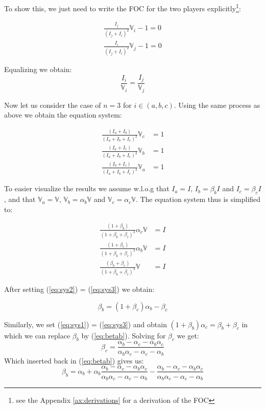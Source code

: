 To show this, we just need to write the FOC for the two players explicitly\footnote{see the Appendix \ref{ax:derivations} for a derivation of the FOC}:

\begin{equation*}
\begin{split}
    \frac{I_j}{(I_j + I_i)^2}\mathbb{V}_i-1 = 0 \\
    \frac{I_i}{(I_j + I_i)^2}\mathbb{V}_j-1 = 0
\end{split}
\end{equation*}

Equalizing we obtain:
\begin{equation}
    \frac{I_i}{\mathbb{V}_i} = \frac{I_j}{\mathbb{V}_j} 
\end{equation}

Now let us consider the case of $n=3$ for $i \in (a,b,c)$. Using the same process as above we obtain the equation system:

\begin{align}
    \frac{(I_a+I_b)}{(I_a+I_b+I_c)^2}\mathbb{V}_c&=1\\
    \frac{(I_a+I_c)}{(I_a+I_b+I_c)^2}\mathbb{V}_b&=1\\
    \frac{(I_b+I_c)}{(I_a+I_b+I_c)^2}\mathbb{V}_a&=1
\end{align}

To easier visualize the results we assume w.l.o.g that $I_a = I$, $I_b = \beta_b I$ and $ I_c = \beta_c I $, and that $\mathbb{V}_a = \mathbb{V}$, $\mathbb{V}_b = \alpha_b \mathbb{V} $ and $\mathbb{V}_c = \alpha_c \mathbb{V}$. The equation system thus is simplified to:

\begin{align}
    \label{eq:sys1}\frac{(1+\beta_b)}{(1+\beta_b+ \beta_c )^2}\alpha_c\mathbb{V}&=I\\
    \label{eq:sys2}\frac{(1+\beta_c )}{(1+\beta_b  + \beta_c )^2}\alpha_b\mathbb{V}&=I\\
    \label{eq:sys3}\frac{(\beta_b +\beta_c )}{(1+\beta_b  + \beta_c )^2}\mathbb{V}&=I
\end{align}

After setting (\ref{eq:sys2}) = (\ref{eq:sys3}) we obtain:

\begin{equation}
    \label{eq:betab}\beta_b=(1+\beta_c)\alpha_b-\beta_c
\end{equation}

Similarly, we set (\ref{eq:sys1}) = (\ref{eq:sys3}) and obtain $(1+\beta_b)\alpha_c=\beta_b+\beta_c$ in which we can replace $\beta_b$ by (\ref{eq:betab}). Solving for $\beta_c$ we get:
\begin{equation}
\label{eq:betac}
    \beta_c = \frac{\alpha_b-\alpha_c-\alpha_b\alpha_c}{\alpha_b\alpha_c-\alpha_c-\alpha_b}
\end{equation}
Which inserted back in (\ref{eq:betab}) gives us:
\begin{equation}
\label{eq:betab2}
    \beta_b=\alpha_b + \alpha_b\frac{\alpha_b-\alpha_c-\alpha_b\alpha_c}{\alpha_b\alpha_c-\alpha_c-\alpha_b}-\frac{\alpha_b-\alpha_c-\alpha_b\alpha_c}{\alpha_b\alpha_c-\alpha_c-\alpha_b}
\end{equation}

